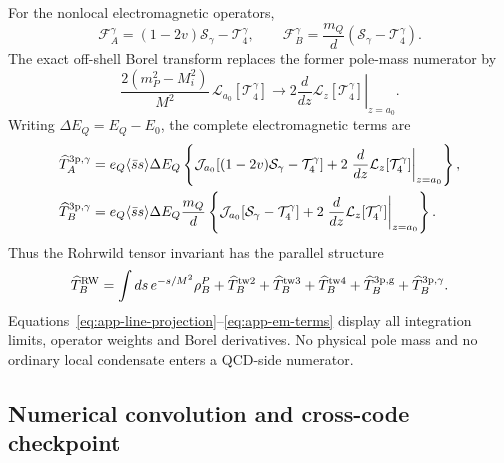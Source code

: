\documentclass[11pt]{article}
\newcommand{\ssbar}{\langle\bar s s\rangle}
\begin{document}
For the nonlocal electromagnetic operators,
\begin{equation}
 \mathcal F_A^\gamma=(1-2v)\mathcal S_\gamma-\mathcal T_4^\gamma,
 \qquad
 \mathcal F_B^\gamma=\frac{m_Q}{d}
 (\mathcal S_\gamma-\mathcal T_4^\gamma).
 \label{eq:app-em-weights}
\end{equation}
The exact off-shell Borel transform replaces the former pole-mass numerator
by
\begin{equation}
 \frac{2(m_P^2-M_i^2)}{M^2}\,
 \mathcal L_{a_0}[\mathcal T_4^\gamma]
 \longrightarrow
 2\left.\frac{d}{dz}\mathcal L_z[\mathcal T_4^\gamma]
 \right|_{z=a_0}.
 \label{eq:app-P-borel-replacement}
\end{equation}
Writing $\Delta E_Q=E_Q-E_0$, the complete electromagnetic terms are
\begin{align}
 \widehat T_A^{\rm 3p,\gamma}
 &=e_Q\ssbar\Delta E_Q
 \left\{\mathcal J_{a_0}[
 (1-2v)\mathcal S_\gamma-\mathcal T_4^\gamma]
 +2\left.\frac{d}{dz}\mathcal L_z[\mathcal T_4^\gamma]
 \right|_{z=a_0}\right\},\nonumber\\
 \widehat T_B^{\rm 3p,\gamma}
 &=e_Q\ssbar\Delta E_Q\frac{m_Q}{d}
 \left\{\mathcal J_{a_0}[
 \mathcal S_\gamma-\mathcal T_4^\gamma]
 +2\left.\frac{d}{dz}\mathcal L_z[\mathcal T_4^\gamma]
 \right|_{z=a_0}\right\}.
 \label{eq:app-em-terms}
\end{align}
Thus the Rohrwild tensor invariant has the parallel structure
\begin{equation}
 \widehat T_B^{\rm RW}=\int ds\,e^{-s/M^2}\rho_B^P
 +\widehat T_B^{\rm tw2}
 +\widehat T_B^{\rm tw3}
 +\widehat T_B^{\rm tw4}
 +\widehat T_B^{\rm 3p,g}
 +\widehat T_B^{\rm 3p,\gamma}.
\end{equation}
Equations~\eqref{eq:app-line-projection}--\eqref{eq:app-em-terms} display all
integration limits, operator weights and Borel derivatives.  No physical
pole mass and no ordinary local condensate enters a QCD-side numerator.

\subsection{Numerical convolution and cross-code checkpoint}
\end{document}
